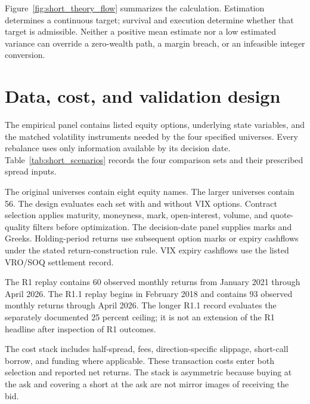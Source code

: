 Figure~\ref{fig:short_theory_flow} summarizes the calculation. Estimation determines a
continuous target; survival and execution determine whether that target is admissible.
Neither a positive mean estimate nor a low estimated variance can override a zero-wealth path,
a margin breach, or an infeasible integer conversion.

\FloatBarrier
\section{Data, cost, and validation design}

The empirical panel contains listed equity options, underlying state variables, and the
matched volatility instruments needed by the four specified universes. Every rebalance uses
only information available by its decision date. Table~\ref{tab:short_scenarios} records
the four comparison sets and their prescribed spread inputs.

\begin{table}[!ht]
\centering
\caption{Empirical universes and baseline evidence. Prototype net is the static
full-cost net Sharpe ratio used to describe the earlier development experiment.}
\label{tab:short_scenarios}
\resizebox{\textwidth}{!}{}
\end{table}

The original universes contain eight equity names. The larger universes contain 56. The
design evaluates each set with and without VIX options. Contract selection applies maturity,
moneyness, mark, open-interest, volume, and quote-quality filters before optimization.
The decision-date panel supplies marks and Greeks. Holding-period returns use subsequent
option marks or expiry cashflows under the stated return-construction rule. VIX expiry
cashflows use the listed VRO/SOQ settlement record.

The R1 replay contains 60 observed monthly returns from January 2021 through April 2026.
The R1.1 replay begins in February 2018 and contains 93 observed monthly returns through
April 2026. The longer R1.1 record evaluates the separately documented 25 percent ceiling; it
is not an extension of the R1 headline after inspection of R1 outcomes.

The cost stack includes half-spread, fees, direction-specific slippage, short-call borrow,
and funding where applicable. These transaction costs enter both selection and reported
net returns. The stack is asymmetric because buying at the ask and covering a short at
the ask are not mirror images of receiving the bid.

